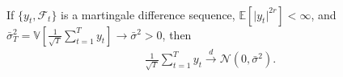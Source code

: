 \begin{theorem}\label{thm:mds-clt}
    \

    If $\{y_t, \mathcal{F}_t\}$ is a martingale difference sequence, $\mathbb{E}[\vert y_t \vert ^{2r}] < \infty$,
    and $\bar{\sigma}_T^2 =  \mathbb{V}\left[\frac{1}{\sqrt{T}} \sum_{t=1}^{T} y_t \right] \to \bar{\sigma}^2 > 0$, then
    \begin{gather*}
        \frac{1}{\sqrt{T}} \sum_{t=1}^{T} y_t \xrightarrow{d} \mathcal{N}(0, \bar{\sigma}^2).
    \end{gather*}
    
\end{theorem}